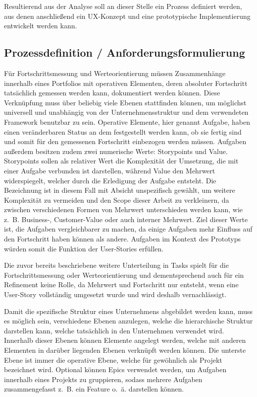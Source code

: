 Resultierend aus der Analyse soll an dieser Stelle ein Prozess definiert werden, aus denen anschließend ein UX-Konzept und eine prototypische Implementierung entwickelt werden kann.
\subsection{Prozessdefinition / Anforderungsformulierung}
Für Fortschrittsmessung und Werteorientierung müssen Zusammenhänge innerhalb eines Portfolios mit operativen Elementen, deren absoluter Fortschritt tatsächlich gemessen werden kann, dokumentiert werden können. Diese Verknüpfung muss über beliebig viele Ebenen stattfinden können, um möglichst universell und unabhängig von der Unternehmensstruktur und dem verwendeten Framework benutzbar zu sein.
Operative Elemente, hier genannt Aufgabe, haben einen veränderbaren Status an dem festgestellt werden kann, ob sie fertig sind und somit für den gemessenen Fortschritt einbezogen werden müssen. Aufgaben außerdem besitzen zudem zwei numerische Werte: Storypoints und Value. Storypoints sollen als relativer Wert die Komplexität der Umsetzung, die mit einer Aufgabe verbunden ist darstellen, während Value den Mehrwert widerspiegelt, welcher durch die Erledigung der Aufgabe entsteht. Die Bezeichnung ist in diesem Fall mit Absicht unspezifisch gewählt, um weitere Komplexität zu vermeiden und den Scope dieser Arbeit zu verkleinern, da zwischen verschiedenen Formen von Mehrwert unterschieden werden kann, wie z. B. Business-, Customer-Value oder auch interner Mehrwert. Ziel dieser Werte ist, die Aufgaben vergleichbarer zu machen, da einige Aufgaben mehr Einfluss auf den Fortschritt haben können als andere. Aufgaben im Kontext des Prototyps würden somit die Funktion der User-Stories erfüllen.

Die zuvor bereits beschriebene weitere Unterteilung in Tasks spielt für die Fortschrittsmessung oder Werteorientierung und dementsprechend auch für ein Refinement keine Rolle, da Mehrwert und Fortschritt nur entsteht, wenn eine User-Story vollständig umgesetzt wurde und wird deshalb vernachlässigt.

Damit die spezifische Struktur eines Unternehmens abgebildet werden kann, muss es möglich sein, verschiedene Ebenen anzulegen, welche die hierarchische Struktur darstellen kann, welche tatsächlich in den Unternehmen verwendet wird. Innerhalb dieser Ebenen können Elemente angelegt werden, welche mit anderen Elementen in darüber liegenden Ebenen verknüpft werden können.
Die unterste Ebene ist immer die operative Ebene, welche für gewöhnlich als Projekt bezeichnet wird. Optional können Epics verwendet werden, um Aufgaben innerhalb eines Projekts zu gruppieren, sodass mehrere Aufgaben zusammengefasst z. B. ein Feature o. ä. darstellen können.

